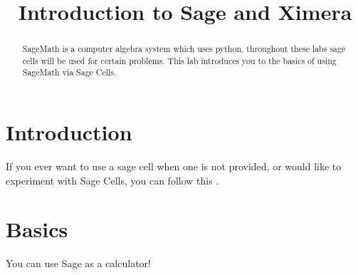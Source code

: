 \documentclass{ximera}
\title{Introduction to Sage and Ximera}
\begin{document}
\begin{abstract}
SageMath is a computer algebra system which uses python, throughout these labs sage cells will be used for certain problems. This lab introduces you to the basics of using SageMath via Sage Cells.
\end{abstract}
\maketitle
\section{Introduction}
If you ever want to use a sage cell when one is not provided, or would like to experiment with Sage Cells, you can follow this .
\section{Basics}
You can use Sage as a calculator!
\end{document}
